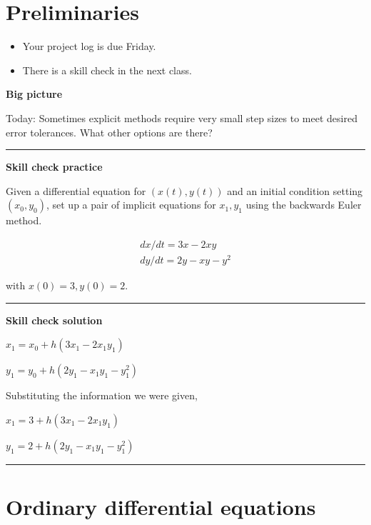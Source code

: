 \documentclass[12pt,letterpaper,noanswers]{exam}
\begin{document}
 \pdfpageheight 11in 
  \pdfpagewidth 8.5in

\noindent 

\section*{Preliminaries}

\begin{itemize}
\itemsep0pt
\item Your project log is due Friday.
\item There is a skill check in the next class.
\end{itemize}


\noindent\textbf{Big picture}

Today: Sometimes explicit methods require very small step sizes to meet desired error tolerances.  What other options are there?

\vspace{0.2cm}
\hrule
\vspace{0.2cm}

\noindent \textbf{Skill check practice}

Given a differential equation for $(x(t),y(t))$ and an initial condition setting $(x_0,y_0)$, set up a pair of implicit equations for $x_1, y_1$ using the backwards Euler method.

\[\displaystyle\begin{array}{l} dx/dt = 3x - 2xy \\
dy/dt= 2y - xy - y^2 \end{array}\]

with $x(0) = 3, y(0) = 2$.

\vspace{0.2cm}
\hrule
\vspace{0.2cm}

\noindent \textbf{Skill check solution}

$x_1 = x_0 + h (3x_1 - 2x_1 y_1)$


$y_1 = y_0 + h (2y_1 - x_1 y_1 - y_1^2)$

Substituting the information we were given,

$x_1 = 3 + h (3x_1 - 2x_1 y_1)$


$y_1 = 2 + h (2y_1 - x_1 y_1 - y_1^2)$




\vspace{0.2cm}
\hrule
\vspace{0.2cm}


\section*{Ordinary differential equations}
\end{document}
